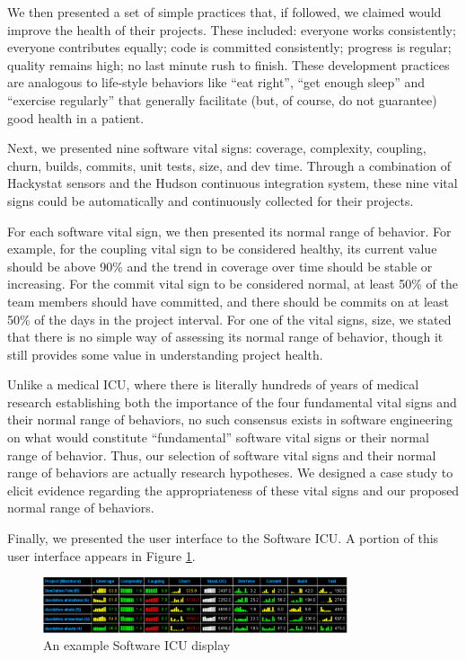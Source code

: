 We then presented a set of simple practices that, if followed, we claimed
would improve the health of their projects.  These included: everyone works
consistently; everyone contributes equally; code is committed consistently;
progress is regular; quality remains high; no last minute rush to finish.
These development practices are analogous to life-style behaviors like
``eat right'', ``get enough sleep'' and ``exercise regularly'' that
generally facilitate (but, of course, do not guarantee) good health in a
patient.

Next, we presented nine software vital signs: coverage, complexity,
coupling, churn, builds, commits, unit tests, size, and dev time. Through a
combination of Hackystat sensors and the Hudson continuous integration
system, these nine vital signs could be automatically and continuously
collected for their projects.

For each software vital sign, we then presented its normal range of
behavior.  For example, for the coupling vital sign to be considered
healthy, its current value should be above 90\% and the trend in
coverage over time should be stable or increasing.  For the commit vital
sign to be considered normal, at least 50\% of the team members should have
committed, and there should be commits on at least 50\% of the days in the
project interval.  For one of the vital signs, size, we stated that
there is no simple way of assessing its normal range of behavior, though
it still provides some value in understanding project health.

Unlike a medical ICU, where there is literally hundreds of years of medical
research establishing both the importance of the four fundamental vital
signs and their normal range of behaviors, no such consensus exists in
software engineering on what would constitute ``fundamental'' software
vital signs or their normal range of behavior.  Thus, our selection of
software vital signs and their normal range of behaviors are actually
research hypotheses.  We designed a case study to elicit evidence
regarding the appropriateness of these vital signs and our proposed normal
range of behaviors.

Finally, we presented the user interface to the Software ICU. A portion of
this user interface appears in Figure \ref{fig:sicu}.

\begin{figure}[ht]
  \center
  \includegraphics[width=0.8\textwidth]{portfolio-2008.eps}
  \caption{An example Software ICU display}
  \label{fig:sicu}
\end{figure} 

